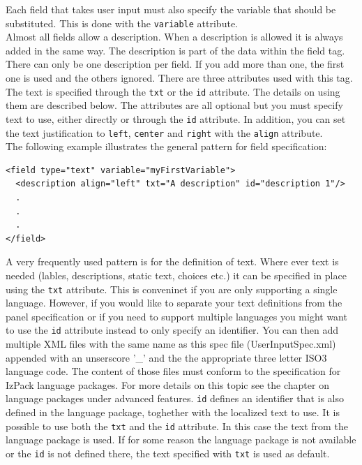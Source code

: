 Each field that takes user input must also specify the variable that
should be substituted. This is done with the \texttt{variable}
attribute.\\

\label{userInput:descriptiontag}
Almost all fields allow a description. When a description is allowed it
is always added in the same way. The description is part of the data
within the field tag. There can only be one description per field. If
you add more than one, the first one is used and the others ignored.
There are three attributes used with this tag. The text is specified
through the \texttt{txt} or the \texttt{id} attribute. The details on
using them are described below. The attributes are all optional but you
must specify text to use, either directly or through the \texttt{id}
attribute. In addition, you can set the text justification to
\texttt{left}, \texttt{center} and \texttt{right} with the
\texttt{align} attribute. \\

The following example illustrates the general pattern for field specification:\\

\footnotesize
\begin{verbatim}
<field type="text" variable="myFirstVariable">
  <description align="left" txt="A description" id="description 1"/>
  .
  .
  .
</field>
\end{verbatim}
\normalsize

A very frequently used pattern is for the definition of text. Where ever
text is needed (lables, descriptions, static text, choices etc.) it can
be specified in place using the \texttt{txt} attribute. This is
conveninet if you are only supporting a single language. However, if you
would like to separate your text definitions from the panel
specification or if you need to support multiple languages you might
want to use the \texttt{id} attribute instead to only specify an
identifier. You can then add multiple XML files with the same name as
this spec file (UserInputSpec.xml) appended with an unserscore '\_' and
the the appropriate three letter ISO3 language code. The content of
those files must conform to the specification for IzPack language
packages. For more details on this topic see the chapter on language
packages under advanced features. \texttt{id} defines an identifier that
is also defined in the language package, toghether with the localized
text to use. It is possible to use both the \texttt{txt} and the
\texttt{id} attribute. In this case the text from the language package
is used. If for some reason the language package is not available or the
\texttt{id} is not defined there, the text specified with \texttt{txt}
is used as default.\\

